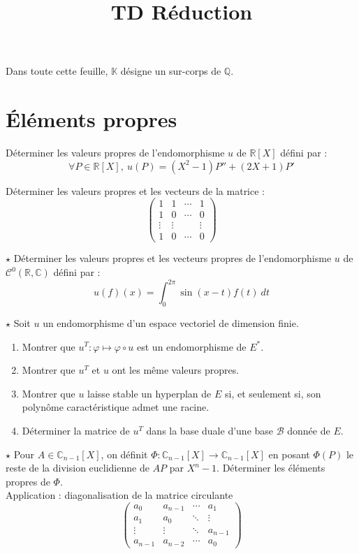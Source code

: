 \documentclass[french,a4paper]{article}
\title{TD Réduction}
\newcommand{\Q}{\mathbb{Q}}
\newcommand{\R}{\mathbb{R}}
\newcommand{\C}{\mathbb{C}}
\newcommand{\K}{\mathbb{K}}
\newcommand{\st}{^*}
\theoremstyle{plain}
\theoremstyle{definition}
\theoremstyle{remark}
\begin{document}
\maketitle

Dans toute cette feuille, $\K$ désigne un sur-corps de $\Q$.

\section{Éléments propres}

\begin{ex}{}
	Déterminer les valeurs propres de l'endomorphisme $u$ de $\R[X]$ défini par : $$\forall P\in\R[X],\ u(P)=(X^2-1)P''+(2X+1)P'$$
\end{ex}

\begin{ex}{}
	Déterminer les valeurs propres et les vecteurs de la matrice : $$\begin{pmatrix}
		1&1&\cdots&1\\
		1&0&\cdots&0\\
		\vdots&\vdots&&\vdots\\
		1&0&\cdots&0
	\end{pmatrix}$$
\end{ex}

\begin{ex}{$\star$}
	Déterminer les valeurs propres et les vecteurs propres de l'endomorphisme $u$ de $\mathcal{C}^0(\R,\C)$ défini par : $$u(f)(x)=\int_{0}^{2\pi}\sin(x-t)f(t)\ dt$$
\end{ex}

\begin{ex}{$\star$}
	Soit $u$ un endomorphisme d'un espace vectoriel de dimension finie.
	\begin{enumerate}
		\item Montrer que $u^T:\varphi\mapsto\varphi\circ u$ est un endomorphisme de $E\st$.
		\item Montrer que $u^T$ et $u$ ont les même valeurs propres.
		\item Montrer que $u$ laisse stable un hyperplan de $E$ si, et seulement si, son polynôme caractéristique admet une racine.
		\item Déterminer la matrice de $u^T$ dans la base duale d'une base $\mathcal{B}$ donnée de $E$.
	\end{enumerate}
\end{ex}

\begin{ex}{$\star$}
	Pour $A\in\C_{n-1}[X]$, on définit $\Phi:\C_{n-1}[X]\to\C_{n-1}[X]$ en posant $\Phi(P)$ le reste de la division euclidienne de $AP$ par $X^n-1$. Déterminer les éléments propres de $\Phi$. \\
	Application : diagonalisation de la matrice circulante $$\begin{pmatrix}
		a_0&a_{n-1}&\cdots&a_1\\
		a_1&a_0&\ddots&\vdots\\
		\vdots&\vdots&\ddots&a_{n-1}\\
		a_{n-1}&a_{n-2}&\cdots&a_0
	\end{pmatrix}$$
\end{ex}
\end{document}
